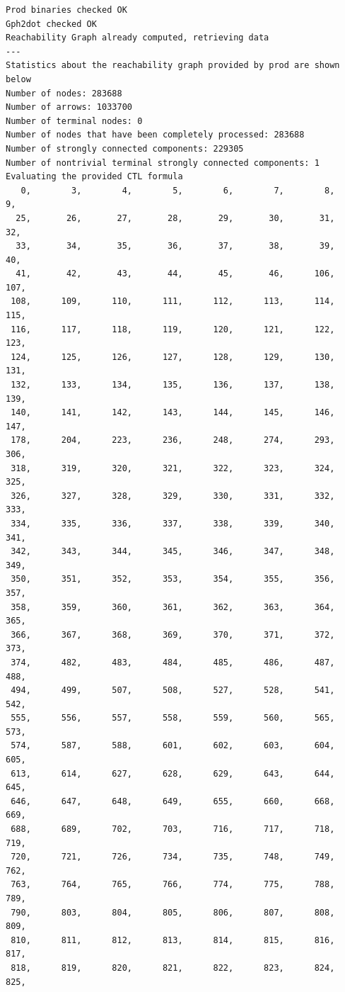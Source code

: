 \documentclass[a4paper,11pt]{report}
\begin{document}
\begin{verbatim}
Prod binaries checked OK
Gph2dot checked OK
Reachability Graph already computed, retrieving data
---
Statistics about the reachability graph provided by prod are shown below
Number of nodes: 283688
Number of arrows: 1033700
Number of terminal nodes: 0
Number of nodes that have been completely processed: 283688
Number of strongly connected components: 229305
Number of nontrivial terminal strongly connected components: 1
Evaluating the provided CTL formula
   0,        3,        4,        5,        6,        7,        8,        9,
  25,       26,       27,       28,       29,       30,       31,       32,
  33,       34,       35,       36,       37,       38,       39,       40,
  41,       42,       43,       44,       45,       46,      106,      107,
 108,      109,      110,      111,      112,      113,      114,      115,
 116,      117,      118,      119,      120,      121,      122,      123,
 124,      125,      126,      127,      128,      129,      130,      131,
 132,      133,      134,      135,      136,      137,      138,      139,
 140,      141,      142,      143,      144,      145,      146,      147,
 178,      204,      223,      236,      248,      274,      293,      306,
 318,      319,      320,      321,      322,      323,      324,      325,
 326,      327,      328,      329,      330,      331,      332,      333,
 334,      335,      336,      337,      338,      339,      340,      341,
 342,      343,      344,      345,      346,      347,      348,      349,
 350,      351,      352,      353,      354,      355,      356,      357,
 358,      359,      360,      361,      362,      363,      364,      365,
 366,      367,      368,      369,      370,      371,      372,      373,
 374,      482,      483,      484,      485,      486,      487,      488,
 494,      499,      507,      508,      527,      528,      541,      542,
 555,      556,      557,      558,      559,      560,      565,      573,
 574,      587,      588,      601,      602,      603,      604,      605,
 613,      614,      627,      628,      629,      643,      644,      645,
 646,      647,      648,      649,      655,      660,      668,      669,
 688,      689,      702,      703,      716,      717,      718,      719,
 720,      721,      726,      734,      735,      748,      749,      762,
 763,      764,      765,      766,      774,      775,      788,      789,
 790,      803,      804,      805,      806,      807,      808,      809,
 810,      811,      812,      813,      814,      815,      816,      817,
 818,      819,      820,      821,      822,      823,      824,      825,

\end{verbatim}
\end{document}

